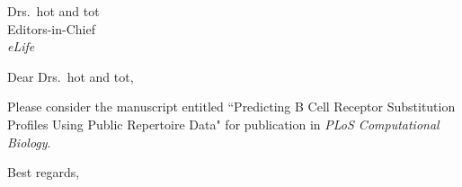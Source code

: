 \documentclass[11pt, helvetica]{letter}
\begin{document}
\begin{letter}
{
Drs.\  hot and tot\\
Editors-in-Chief\\
\textit{eLife}
}

\opening{Dear Drs.\ hot and tot,} 

\thispagestyle{fancy}

Please consider the manuscript entitled ``Predicting B Cell Receptor Substitution Profiles Using Public Repertoire Data" for publication in \textit{PLoS Computational Biology}. 





 \closing{
Best regards,
}
  
\end{letter}
 
\end{document}
